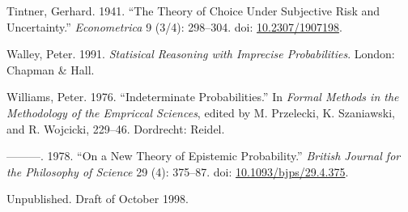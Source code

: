 \documentclass[
  10pt,
  letterpaper,
  DIV=11,
  numbers=noendperiod,
  twoside]{scrartcl}
\newlength{\cslhangindent}
\newenvironment{CSLReferences}[2] %
 {\begin{list}{}{%
  \setlength{\itemindent}{0pt}
  \setlength{\leftmargin}{0pt}
  \setlength{\parsep}{0pt}
  \ifodd #1
   \setlength{\leftmargin}{\cslhangindent}
   \setlength{\itemindent}{-1\cslhangindent}
  \fi
  \setlength{\itemsep}{#2\baselineskip}}}
 {\end{list}}
\begin{document}
\begin{CSLReferences}{1}{0}
Tintner, Gerhard. 1941. {``The Theory of Choice Under Subjective Risk
and Uncertainty.''} \emph{Econometrica} 9 (3/4): 298--304. doi:
\href{https://doi.org/10.2307/1907198}{10.2307/1907198}.

Walley, Peter. 1991. \emph{Statisical Reasoning with Imprecise
Probabilities}. London: Chapman \& Hall.

Williams, Peter. 1976. {``Indeterminate Probabilities.''} In
\emph{Formal Methods in the Methodology of the Empriccal Sciences},
edited by M. Przelecki, K. Szaniawski, and R. Wojcicki, 229--46.
Dordrecht: Reidel.

---------. 1978. {``On a New Theory of Epistemic Probability.''}
\emph{British Journal for the Philosophy of Science} 29 (4): 375--87.
doi:
\href{https://doi.org/10.1093/bjps/29.4.375}{10.1093/bjps/29.4.375}.

\end{CSLReferences}



\noindent Unpublished. Draft of October 1998.
\end{document}
